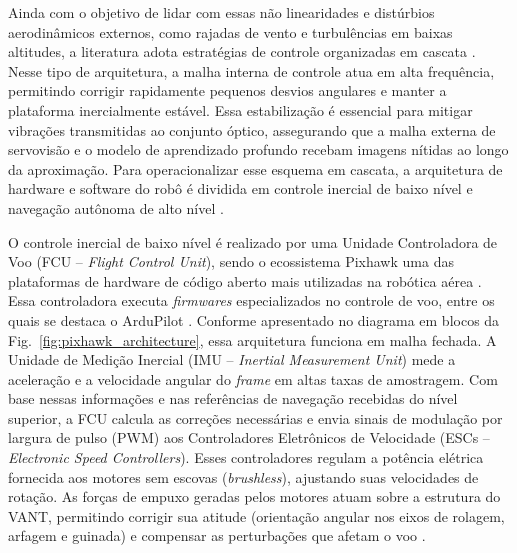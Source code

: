 Ainda com o objetivo de lidar com essas não linearidades e distúrbios aerodinâmicos externos, como rajadas de vento e turbulências em baixas altitudes, a literatura adota estratégias de controle organizadas em cascata \cite{zhang2021}. Nesse tipo de arquitetura, a malha interna de controle atua em alta frequência, permitindo corrigir rapidamente pequenos desvios angulares e manter a plataforma inercialmente estável. Essa estabilização é essencial para mitigar vibrações transmitidas ao conjunto óptico, assegurando que a malha externa de servovisão e o modelo de aprendizado profundo recebam imagens nítidas ao longo da aproximação. Para operacionalizar esse esquema em cascata, a arquitetura de hardware e software do robô é dividida em controle inercial de baixo nível e navegação autônoma de alto nível \cite{shang2016, sciortino2018}.

O controle inercial de baixo nível é realizado por uma Unidade Controladora de Voo (FCU -- \textit{Flight Control Unit}), sendo o ecossistema Pixhawk uma das plataformas de hardware de código aberto mais utilizadas na robótica aérea \cite{shang2016}. Essa controladora executa \textit{firmwares} especializados no controle de voo, entre os quais se destaca o ArduPilot \cite{sciortino2018}. Conforme apresentado no diagrama em blocos da Fig.~\ref{fig:pixhawk_architecture}, essa arquitetura funciona em malha fechada. A Unidade de Medição Inercial (IMU -- \textit{Inertial Measurement Unit}) mede a aceleração e a velocidade angular do \textit{frame} em altas taxas de amostragem. Com base nessas informações e nas referências de navegação recebidas do nível superior, a FCU calcula as correções necessárias e envia sinais de modulação por largura de pulso (PWM) aos Controladores Eletrônicos de Velocidade (ESCs -- \textit{Electronic Speed Controllers}). Esses controladores regulam a potência elétrica fornecida aos motores sem escovas (\textit{brushless}), ajustando suas velocidades de rotação. As forças de empuxo geradas pelos motores atuam sobre a estrutura do VANT, permitindo corrigir sua atitude (orientação angular nos eixos de rolagem, arfagem e guinada) e compensar as perturbações que afetam o voo \cite{sciortino2018}.

